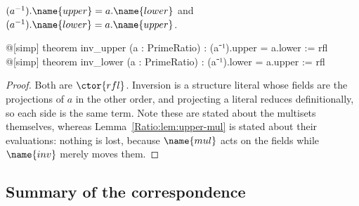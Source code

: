 \begin{lemma}\label{Ratio:lem:inv}
$(a^{-1}).\name{upper} = a.\name{lower}$ and
$(a^{-1}).\name{lower} = a.\name{upper}$.
\end{lemma}

\begin{leancode}
@[simp] theorem inv_upper (a : PrimeRatio) : (a⁻¹).upper = a.lower := rfl
@[simp] theorem inv_lower (a : PrimeRatio) : (a⁻¹).lower = a.upper := rfl
\end{leancode}

\begin{proof}
Both are $\ctor{rfl}$.  Inversion is a structure literal whose fields are the
projections of $a$ in the other order, and projecting a literal reduces
definitionally, so each side is the same term.  Note these are stated about
the multisets themselves, whereas
Lemma~\ref{Ratio:lem:upper-mul} is stated about their evaluations: nothing is
lost, because $\name{mul}$ acts on the fields while $\name{inv}$ merely moves
them.
\end{proof}

\subsection*{Summary of the correspondence}

